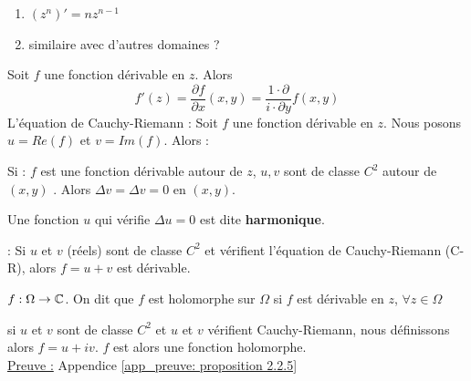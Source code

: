 \documentclass[12pt,a4paper]{article}
\begin{document}
\begin{enumerate}
    \item     $(z^n)' = nz^{n-1}$
    \item     similaire avec d'autres domaines ?  %
\end{enumerate}
 Soit $f$ une fonction dérivable en $z$. Alors 
\begin{equation}
    f'(z) = \frac{\partial f}{\partial x}(x,y) =\frac{1 \cdot \partial}{i\cdot \partial y}f(x,y)
\end{equation}
 L'équation de Cauchy-Riemann : Soit $f$ une fonction dérivable en $z$. Nous posons $u = Re(f)$ et $v = Im(f)$. Alors : 

 Si : $f$ est une fonction dérivable autour de $z$, $u,v$ sont de classe $C^2$ autour de $(x,y)$ . Alors $\Delta v = \Delta v = 0$ en $(x,y)$.
\begin{boite}
     Une fonction $u$ qui vérifie $\Delta u = 0$ est dite \textbf{harmonique}.
\end{boite}
 : Si $u$ et $v$ (réels) sont de classe $C^2$ et vérifient l'équation de Cauchy-Riemann (C-R), alors $f = u+v$ est dérivable.

\begin{boite}
     $f: \Omega \to \mathbb{C}$. On dit que $f$ est holomorphe sur $\Omega$ si $f$ est dérivable en $z$, $\forall z \in \Omega$
\end{boite}

 si $u$ et $v$ sont de classe $C^2$ et $u$ et $v$ vérifient Cauchy-Riemann, nous définissons alors $f = u + iv$. $f$ est alors une fonction holomorphe. \\
\uline{Preuve :} Appendice \ref{app_preuve: proposition 2.2.5}
\end{document}
